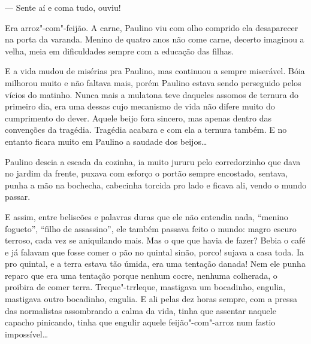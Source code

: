 --- Sente aí e coma tudo, ouviu!

Era arroz"-com"-feijão. A carne, Paulino viu com olho comprido ela
desaparecer na porta da varanda. Menino de quatro anos não come carne,
decerto imaginou a velha, meia em dificuldades sempre com a educação das
filhas.

E a vida mudou de misérias pra Paulino, mas continuou a sempre
miserável. Bóia milhorou muito e não faltava mais, porém Paulino estava
sendo perseguido pelos vícios do matinho. Nunca mais a mulatona teve
daqueles assomos de ternura do primeiro dia, era uma dessas cujo
mecanismo de vida não difere muito do cumprimento do dever. Aquele beijo
fora sincero, mas apenas dentro das convenções da tragédia. Tragédia
acabara e com ela a ternura também. E no entanto ficara muito em Paulino
a saudade dos beijos\ldots{}


Paulino descia a escada da cozinha, ia muito jururu pelo corredorzinho
que dava no jardim da frente, puxava com esforço o portão sempre
encostado, sentava, punha a mão na bochecha, cabecinha torcida pro lado
e ficava ali, vendo o mundo passar.

E assim, entre beliscões e palavras duras que ele não entendia nada,
``menino fogueto'', ``filho de assassino'', ele também passava feito o
mundo: magro escuro terroso, cada vez se aniquilando mais. Mas o que que
havia de fazer? Bebia o café e já falavam que fosse comer o pão no
quintal sinão, porco! sujava a casa toda. Ia pro quintal, e a terra
estava tão úmida, era uma tentação danada! Nem ele punha reparo que era
uma tentação porque nenhum cocre, nenhuma colherada, o proibira de comer
terra. Treque"-trrleque, mastigava um bocadinho, engulia, mastigava outro
bocadinho, engulia. E ali pelas dez horas sempre, com a pressa das
normalistas assombrando a calma da vida, tinha que assentar naquele
capacho pinicando, tinha que engulir aquele feijão"-com"-arroz num fastio
impossível\ldots{}


